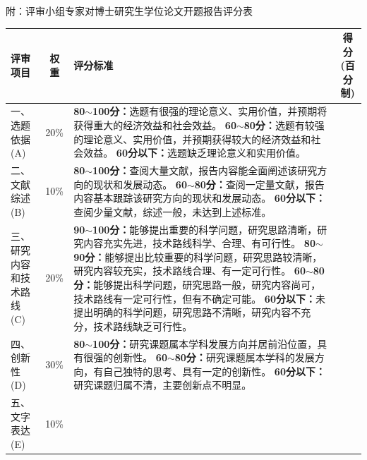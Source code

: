 \documentclass[UTF8, a4paper, zihao=-4, fontset=mac]{ctexart}
\begin{document}
\clearpage
\begin{center}
{\fangsong 附：评审小组专家对博士研究生学位论文开题报告评分表}
\end{center}

\vspace{0.4cm}

{\fangsong
\renewcommand{\arraystretch}{1.2}
\setlength{\tabcolsep}{4pt}
\noindent
\begin{tabularx}{\textwidth}{|p{2.4cm}|c|X|c|}
\hline
\textbf{评审项目} & \textbf{权重} & \textbf{评分标准} & \makecell{\textbf{得分}\\\textbf{(百分制)}} \\
\hline
\makecell[l]{一、选题依据\\(A)} & 20\% &
\textbf{80$\sim$100分：}选题有很强的理论意义、实用价值，并预期将获得重大的经济效益和社会效益。
\textbf{60$\sim$80分：}选题有较强的理论意义、实用价值，并预期获得较大的经济效益和社会效益。
\textbf{60分以下：}选题缺乏理论意义和实用价值。 & \\
\hline
\makecell[l]{二、文献综述\\(B)} & 10\% &
\textbf{80$\sim$100分：}查阅大量文献，报告内容能全面阐述该研究方向的现状和发展动态。
\textbf{60$\sim$80分：}查阅一定量文献，报告内容基本跟踪该研究方向的现状和发展动态。
\textbf{60分以下：}查阅少量文献，综述一般，未达到上述标准。 & \\
\hline
\makecell[l]{三、研究内容\\和技术路线\\(C)} & 20\% &
\textbf{90$\sim$100分：}能够提出重要的科学问题，研究思路清晰，研究内容充实先进，技术路线科学、合理、有可行性。
\textbf{80$\sim$90分：}能够提出比较重要的科学问题，研究思路较清晰，研究内容较充实，技术路线合理、有一定可行性。
\textbf{60$\sim$80分：}能够提出科学问题，研究思路一般，研究内容尚可，技术路线有一定可行性，但有不确定可能。
\textbf{60分以下：}未提出明确的科学问题，研究思路不清晰，研究内容不充分，技术路线缺乏可行性。 & \\
\hline
\makecell[l]{四、创新性\\(D)} & 30\% &
\textbf{80$\sim$100分：}研究课题属本学科发展方向并居前沿位置，具有很强的创新性。
\textbf{60$\sim$80分：}研究课题属本学科的发展方向，有自己独特的思考、具有一定的创新性。
\textbf{60分以下：}研究课题归属不清，主要创新点不明显。 & \\
\hline
\makecell[l]{五、文字表达\\(E)} & 10\% &

\end{tabularx}}
\end{document}
